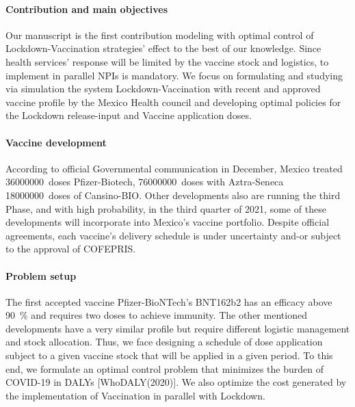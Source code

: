 \paragraph{Contribution and main objectives}
        Our manuscript is the first contribution modeling with optimal control
    of Lockdown-Vaccination strategies' effect to the best of our knowledge.
    Since health services' response will be limited by the vaccine stock
    and logistics, to implement in parallel NPIs is mandatory. We focus on
    formulating and studying via simulation the system Lockdown-Vaccination
    with recent and approved vaccine profile by the  Mexico Health council and
    developing optimal policies for the Lockdown release-input and Vaccine
    application doses.
\paragraph{Vaccine development}
        According to official Governmental communication in December, Mexico
    treated  \SI{36000000}{doses} Pfizer-Biotech, \SI{76000000}{doses} with
    Aztra-Seneca \SI{18000000}{doses} of Cansino-BIO. Other developments
    also are running the  third Phase, and with high probability,  in the
    third quarter of 2021, some of these developments will incorporate into
    Mexico's vaccine portfolio. Despite official agreements, each vaccine's
    delivery schedule is under uncertainty and-or subject to the approval
    of COFEPRIS.
\paragraph{Problem setup}
        The first accepted vaccine \textemdash Pfizer-BioNTech's BNT162b2
    \textemdash has an efficacy above \SI{90}{\percent}  and requires
    two doses to achieve immunity. The other mentioned developments have a very
    similar profile but require different logistic management and stock
    allocation.  Thus, we face designing a schedule of dose application subject
    to a given vaccine stock that will be applied in a given period. To this
    end, we formulate an optimal control problem that minimizes the burden of
    COVID-19 in DALYs [WhoDALY(2020)]. We also optimize the cost generated by
    the implementation of Vaccination in parallel with Lockdown.

